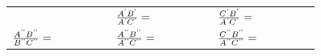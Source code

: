 {{\begin{center}
\begin{tabular}[t]{|l|l|l|}
               &
                \begin{math}\frac{{A}^{\text{'}}{B}^{\text{'}}}{{A}^{\text{'}}{C}^{\text{'}}}=\phantom{\rule{42.67912pt}{0ex}}\end{math}
               &
                \begin{math}\frac{{C}^{\text{'}}{B}^{\text{'}}}{{A}^{\text{'}}{C}^{\text{'}}}=\phantom{\rule{42.67912pt}{0ex}}\end{math}
     \tabularnewline\cline{1-1}\cline{2-2}\cline{3-3}
                \begin{math}\frac{{A}^{\text{'}\text{'}}{B}^{\text{'}\text{'}}}{{B}^{\text{'}\text{'}}{C}^{\text{'}\text{'}}}=\phantom{\rule{42.67912pt}{0ex}}\end{math}
               &
                \begin{math}\frac{{A}^{\text{'}\text{'}}{B}^{\text{'}\text{'}}}{{A}^{\text{'}\text{'}}{C}^{\text{'}\text{'}}}=\phantom{\rule{42.67912pt}{0ex}}\end{math}
               &
                \begin{math}\frac{{C}^{\text{'}\text{'}}{B}^{\text{'}\text{'}}}{{A}^{\text{'}\text{'}}{C}^{\text{'}\text{'}}}=\phantom{\rule{42.67912pt}{0ex}}\end{math}
     \tabularnewline\cline{1-1}\cline{2-2}\cline{3-3}
    \end{tabular}
      \end{center}
}}
